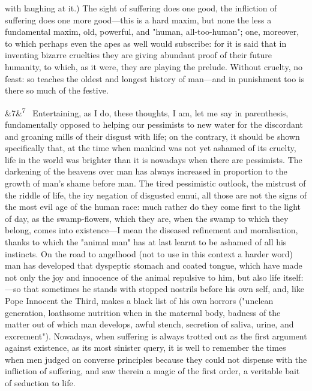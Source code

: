\documentclass[12pt]{article}
\newcommand{\para}[1][]{\par\noindent\ifx&#1&\else\textsuperscript{\footnotesize #1}~\fi}
\begin{document}
with laughing at it.) The sight of suffering does one good, the infliction of suffering does one more good---this is a hard maxim, but none the less a fundamental maxim, old, powerful, and "human, all-too-human"; one, moreover, to which perhaps even the apes as well would subscribe: for it is said that in inventing bizarre cruelties they are giving abundant proof of their future humanity, to which, as it were, they are playing the prelude. Without cruelty, no feast: so teaches the oldest and longest history of man---and in punishment too is there so much of the festive.

\para[7] Entertaining, as I do, these thoughts, I am, let me say in parenthesis, fundamentally opposed to helping our pessimists to new water for the discordant and groaning mills of their disgust with life; on the contrary, it should be shown specifically that, at the time when mankind was not yet ashamed of its cruelty, life in the world was brighter than it is nowadays when there are pessimists. The darkening of the heavens over man has always increased in proportion to the growth of man's shame before man. The tired pessimistic outlook, the mistrust of the riddle of life, the icy negation of disgusted ennui, all those are not the signs of the most evil age of the human race: much rather do they come first to the light of day, as the swamp-flowers, which they are, when the swamp to which they belong, comes into existence---I mean the diseased refinement and moralisation, thanks to which the "animal man" has at last learnt to be ashamed of all his instincts. On the road to angelhood (not to use in this context a harder word) man has developed that dyspeptic stomach and coated tongue, which have made not only the joy and innocence of the animal repulsive to him, but also life itself:---so that sometimes he stands with stopped nostrils before his own self, and, like Pope Innocent the Third, makes a black list of his own horrors ("unclean generation, loathsome nutrition when in the maternal body, badness of the matter out of which man develops, awful stench, secretion of saliva, urine, and excrement"). Nowadays, when suffering is always trotted out as the first argument against existence, as its most sinister query, it is well to remember the times when men judged on converse principles because they could not dispense with the infliction of suffering, and saw therein a magic of the first order, a veritable bait of seduction to life.
\end{document}
